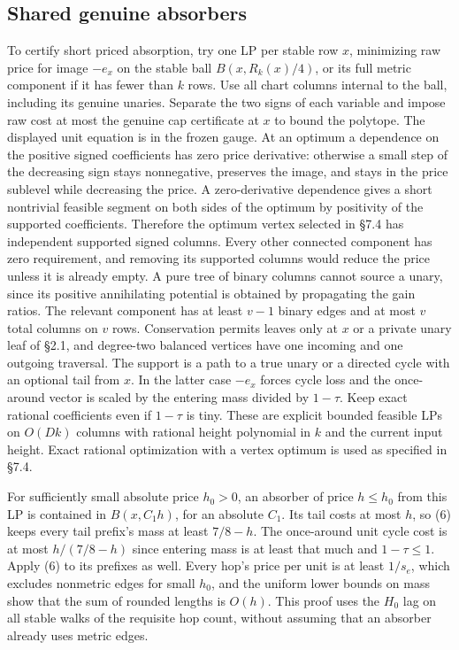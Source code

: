 \documentclass[11pt]{article}
\begin{document}
\hypertarget{shared-genuine-absorbers}{%
\subsection{Shared genuine absorbers}\label{shared-genuine-absorbers}}

To certify short priced absorption, try one LP per stable row \(x\), minimizing raw price for image \(-e_x\) on the stable ball \(B(x,R_k(x)/4)\), or its full metric component if it has fewer than \(k\) rows. Use all chart columns internal to the ball, including its genuine unaries. Separate the two signs of each variable and impose raw cost at most the genuine cap certificate at \(x\) to bound the polytope. The displayed unit equation is in the frozen gauge. At an optimum a dependence on the positive signed coefficients has zero price derivative: otherwise a small step of the decreasing sign stays nonnegative, preserves the image, and stays in the price sublevel while decreasing the price. A zero-derivative dependence gives a short nontrivial feasible segment on both sides of the optimum by positivity of the supported coefficients. Therefore the optimum vertex selected in §7.4 has independent supported signed columns. Every other connected component has zero requirement, and removing its supported columns would reduce the price unless it is already empty. A pure tree of binary columns cannot source a unary, since its positive annihilating potential is obtained by propagating the gain ratios. The relevant component has at least \(v-1\) binary edges and at most \(v\) total columns on \(v\) rows. Conservation permits leaves only at \(x\) or a private unary leaf of §2.1, and degree-two balanced vertices have one incoming and one outgoing traversal. The support is a path to a true unary or a directed cycle with an optional tail from \(x\). In the latter case \(-e_x\) forces cycle loss and the once-around vector is scaled by the entering mass divided by \(1-\tau\). Keep exact rational coefficients even if \(1-\tau\) is tiny. These are explicit bounded feasible LPs on \(O(Dk)\) columns with rational height polynomial in \(k\) and the current input height. Exact rational optimization with a vertex optimum is used as specified in §7.4.

For sufficiently small absolute price \(h_0>0\), an absorber of price \(h\le h_0\) from this LP is contained in \(B(x,C_1h)\), for an absolute \(C_1\). Its tail costs at most \(h\), so (6) keeps every tail prefix's mass at least \(7/8-h\). The once-around unit cycle cost is at most \(h/(7/8-h)\) since entering mass is at least that much and \(1-\tau\le1\). Apply (6) to its prefixes as well. Every hop's price per unit is at least \(1/s_e\), which excludes nonmetric edges for small \(h_0\), and the uniform lower bounds on mass show that the sum of rounded lengths is \(O(h)\). This proof uses the \(H_0\) lag on all stable walks of the requisite hop count, without assuming that an absorber already uses metric edges.
\end{document}
